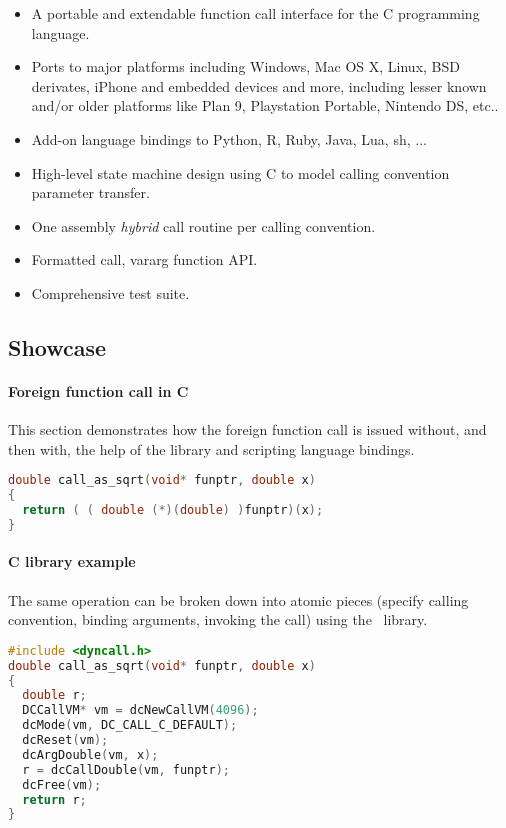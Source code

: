 \begin{itemize}
\item A portable and extendable function call interface for the C programming 
language.
\item Ports to major platforms including Windows, Mac OS X, Linux, BSD derivates, iPhone and embedded devices and more, including lesser known and/or older platforms like Plan 9, Playstation Portable, Nintendo DS, etc..
\item Add-on language bindings to Python, R, Ruby, Java, Lua, sh, ...
\item High-level state machine design using C to model calling convention
parameter transfer.
\item One assembly \emph{hybrid} call routine per calling convention.
\item Formatted call, vararg function API.
\item Comprehensive test suite.
\end{itemize}

\pagebreak

\subsection{Showcase}

\paragraph{Foreign function call in C}
This section demonstrates how the foreign function call is issued without, and then 
with, the help of the  library and scripting language
bindings.

\begin{lstlisting}[language=c,caption=Foreign function call in C]
double call_as_sqrt(void* funptr, double x)
{
  return ( ( double (*)(double) )funptr)(x);
}
\end{lstlisting}

\paragraph{ C library example}

The same operation can be broken down into atomic pieces 
(specify calling convention, binding arguments, invoking the call)
using the \dc\ library.

\begin{lstlisting}[language=c,caption=Dyncall C library example]
#include <dyncall.h>
double call_as_sqrt(void* funptr, double x)
{
  double r;
  DCCallVM* vm = dcNewCallVM(4096);
  dcMode(vm, DC_CALL_C_DEFAULT);
  dcReset(vm);
  dcArgDouble(vm, x);  
  r = dcCallDouble(vm, funptr);
  dcFree(vm);
  return r;
}
\end{lstlisting}

